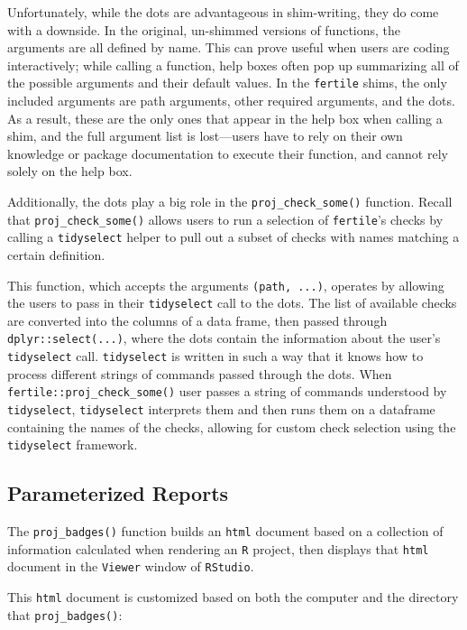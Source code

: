 \documentclass[12pt,twoside]{reedthesis}
\begin{document}
Unfortunately, while the dots are advantageous in shim-writing, they do come with a downside. In the original, un-shimmed versions of functions, the arguments are all defined by name. This can prove useful when users are coding interactively; while calling a function, help boxes often pop up summarizing all of the possible arguments and their default values. In the \texttt{fertile} shims, the only included arguments are path arguments, other required arguments, and the dots. As a result, these are the only ones that appear in the help box when calling a shim, and the full argument list is lost---users have to rely on their own knowledge or package documentation to execute their function, and cannot rely solely on the help box.

Additionally, the dots play a big role in the \texttt{proj\_check\_some()} function. Recall that \texttt{proj\_check\_some()} allows users to run a selection of \texttt{fertile}'s checks by calling a \texttt{tidyselect} helper to pull out a subset of checks with names matching a certain definition.

This function, which accepts the arguments \texttt{(path,\ ...)}, operates by allowing the users to pass in their \texttt{tidyselect} call to the dots. The list of available checks are converted into the columns of a data frame, then passed through \texttt{dplyr::select(...)}, where the dots contain the information about the user's \texttt{tidyselect} call. \texttt{tidyselect} is written in such a way that it knows how to process different strings of commands passed through the dots. When \texttt{fertile::proj\_check\_some()} user passes a string of commands understood by \texttt{tidyselect}, \texttt{tidyselect} interprets them and then runs them on a dataframe containing the names of the checks, allowing for custom check selection using the \texttt{tidyselect} framework.

\hypertarget{parameterized-reports}{%
\subsection{Parameterized Reports}\label{parameterized-reports}}

The \texttt{proj\_badges()} function builds an \texttt{html} document based on a collection of information calculated when rendering an \texttt{R} project, then displays that \texttt{html} document in the \texttt{Viewer} window of \texttt{RStudio}.

This \texttt{html} document is customized based on both the computer and the directory that \texttt{proj\_badges()}:
\end{document}
